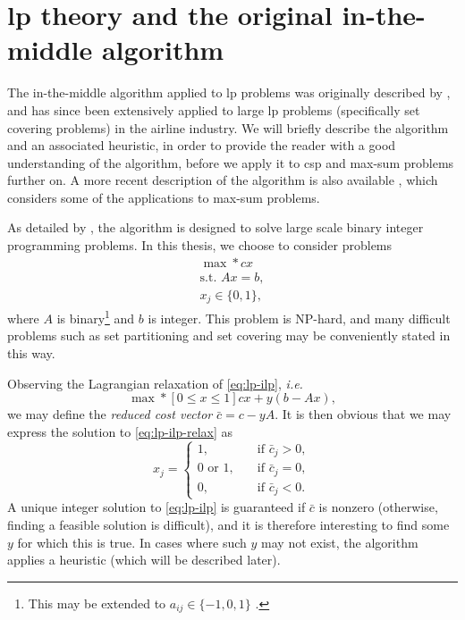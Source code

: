 \section[Linear programming theory]{\acrlong{lp} theory and the original in-the-middle algorithm}
The in-the-middle algorithm applied to \gls{lp} problems was originally described by \textcite{Wedelin95}, and has since been extensively applied to large \acrlong{lp} problems (specifically set covering problems) in the airline industry.
We will briefly describe the algorithm and an associated heuristic, in order to provide the reader with a good understanding of the algorithm, before we apply it to \gls{csp} and max-sum problems further on. A more recent description of the algorithm is also available \parencite{Wedelin13}, which considers some of the applications to max-sum problems.

As detailed by \textcite{Wedelin95}, the algorithm is designed to solve large scale binary integer programming problems.
In this thesis, we choose to consider problems
\begin{equation}
	\label{eq:lp-ilp}
	\begin{gathered}
		\max* cx \\
		\text{s.t. } Ax = b, \\
		x_j \in \{0,1\},
	\end{gathered}
\end{equation}
where \(A\) is binary\footnote{This may be extended to \(a_{ij}\in\{-1,0,1\}\) \parencite{Wedelin13}.} and \(b\) is integer.
This problem is NP-hard, and many difficult problems such as set partitioning and set covering may be conveniently stated in this way.

Observing the Lagrangian relaxation of \eqref{eq:lp-ilp}, \emph{i.e.}
\begin{equation}
	\label{eq:lp-ilp-relax}
	\max*[0\leq x\leq1] cx + y(b-Ax),
\end{equation}
we may define the \emph{reduced cost vector} \(\bar{c}=c-yA\).
It is then obvious that we may express the solution to \eqref{eq:lp-ilp-relax} as
\begin{equation*}
	x_j = 
	\begin{cases}
		1, &\quad \text{if \(\bar{c}_j > 0\)}, \\
		0\text{ or }1, &\quad \text{if \(\bar{c}_j = 0\)}, \\
		0, &\quad \text{if \(\bar{c}_j < 0\)}.
	\end{cases}
\end{equation*}
A unique integer solution to \eqref{eq:lp-ilp} is guaranteed if \(\bar{c}\) is nonzero (otherwise, finding a feasible solution is difficult), and it is therefore interesting to find some \(y\) for which this is true.
In cases where such \(y\) may not exist, the algorithm applies a heuristic (which will be described later).

